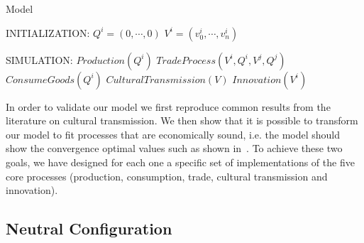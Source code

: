 \documentclass{wscpaperproc}
\begin{document}
\begin{algorithm}
\caption{Model}
\label{algo:complete}
	\begin{algorithmic}[1]
	\scriptsize
	\State INITIALIZATION: 
		 
				\State $Q^i = (0, \cdots, 0)$
				\State $V^i = (v^i_0, \cdots, v^i_n)$ 
		\EndFor

	\State SIMULATION:
				\State $Production(Q^i)$
			\EndFor
					\State $TradeProcess(V^i,Q^i,V^j,Q^j)$
				\EndFor		
			\EndFor
				\State $ConsumeGoods(Q^i)$ 
					\State $CulturalTransmission(V)$
					\State $Innovation(V^i)$
				\EndIf
			\EndFor
		\EndLoop
\end{algorithmic}
\end{algorithm}


In order to validate our model we first reproduce common results from the literature on cultural transmission. We then show that it is possible to transform our model to fit processes that are economically sound, i.e. the model should show the convergence optimal values such as shown in~\cite{gintis_emergence_2006}. To achieve these two goals, we have designed for each one a specific set of implementations of the five core processes (production, consumption, trade, cultural transmission and innovation). 


\subsection{Neutral Configuration}\label{sec:culturalTrans}
\end{document}
